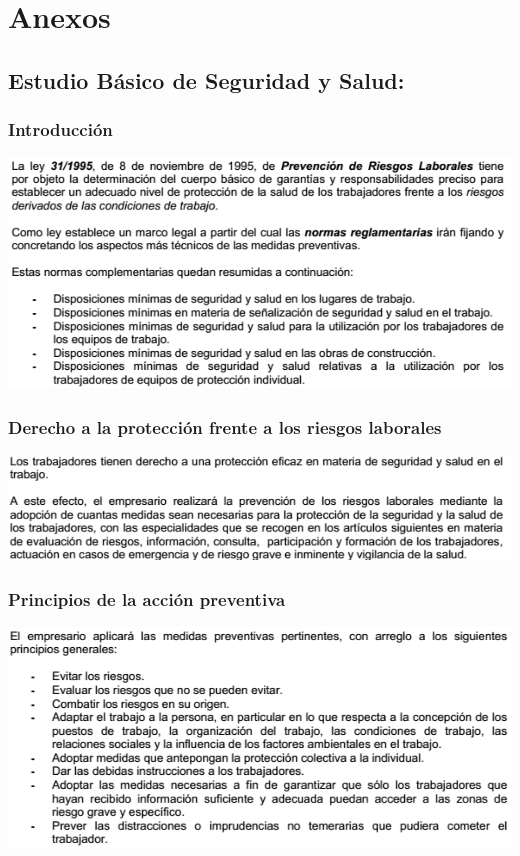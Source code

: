 \newpage \section{Anexos}


   \subsection{Estudio Básico de Seguridad y Salud:}
\subsubsection{Introducción}
\includegraphics[width=15cm,keepaspectratio]{Memoria/EBSS/1.png}
\subsubsection{Derecho a la protección frente a los riesgos laborales}
\includegraphics[width=15cm,keepaspectratio]{Memoria/EBSS/2.png}
\subsubsection{Principios de la acción preventiva}
\includegraphics[width=15cm,keepaspectratio]{Memoria/EBSS/3.png}
